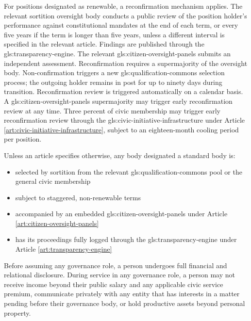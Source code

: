 For positions designated as renewable, a reconfirmation mechanism applies. The relevant sortition oversight body conducts a public review of the position holder's performance against constitutional mandates at the end of each term, or every five years if the term is longer than five years, unless a different interval is specified in the relevant article. Findings are published through the \gls{gls:transparency-engine}. The relevant \gls{gls:citizen-oversight-panels} submits an independent assessment. Reconfirmation requires a supermajority of the oversight body. Non-confirmation triggers a new \gls{gls:qualification-commons} selection process; the outgoing holder remains in post for up to ninety days during transition. Reconfirmation review is triggered automatically on a calendar basis. A \gls{gls:citizen-oversight-panels} supermajority may trigger early reconfirmation review at any time. Three percent of civic membership may trigger early reconfirmation review through the \gls{gls:civic-initiative-infrastructure} under Article \ref{art:civic-initiative-infrastructure}, subject to an eighteen-month cooling period per position.

Unless an article specifies otherwise, any body designated a standard body is:
\begin{itemize}
  \item selected by sortition from the relevant \gls{gls:qualification-commons} pool or the general civic membership
  \item subject to staggered, non-renewable terms
  \item accompanied by an embedded \gls{gls:citizen-oversight-panels} under Article \ref{art:citizen-oversight-panels}
  \item has its proceedings fully logged through the \gls{gls:transparency-engine} under Article \ref{art:transparency-engine}
\end{itemize}

Before assuming any governance role, a person undergoes full financial and relational disclosure. During service in any governance role, a person may not receive income beyond their public salary and any applicable civic service premium, communicate privately with any entity that has interests in a matter pending before their governance body, or hold productive assets beyond personal property.

